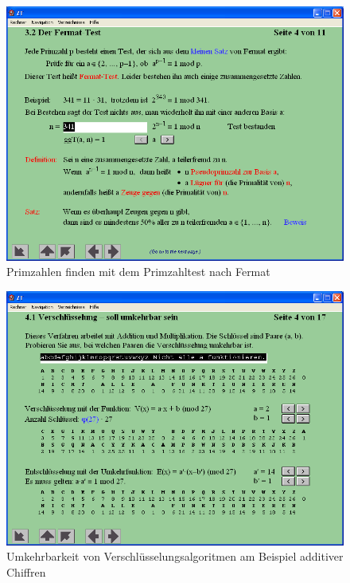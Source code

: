 \begin{refsegment}
\begin{figure}[ht]
\begin{center}
\includegraphics[scale=0.4]{figures/NT_Fig_C3-2_Fermat-Test}
\caption{Primzahlen finden mit dem Primzahltest nach Fermat}
\label{NT_Fig_C3.2_Fermat-Test}
\end{center}
\end{figure}


\begin{figure}[ht]
\begin{center}
\includegraphics[scale=0.4]{figures/NT_Fig_C4-1_ReversibilityAdditiveCipher}
\caption{Umkehrbarkeit von Verschlüsselungsalgoritmen am Beispiel additiver Chiffren}
\label{NT_Fig_C4.1_ReversibilityAdditiveCipher}
\end{center}
\end{figure}



\end{refsegment}
